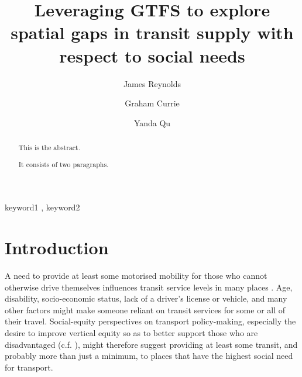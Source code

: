 \documentclass[preprint, 3p,
authoryear]{elsarticle} %
\begin{document}
\begin{frontmatter}

  \title{Leveraging GTFS to explore spatial gaps in transit supply with
respect to social needs}
    \author[Public Transport Research Group (PTRG)]{James Reynolds%
  }
    \author[Public Transport Research Group (PTRG)]{Graham Currie%
  }
    \author[Public Transport Research Group (PTRG)]{Yanda Qu%
  }
  
  \begin{abstract}
  This is the abstract.

  It consists of two paragraphs.
  \end{abstract}
    \begin{keyword}
    keyword1 \sep 
    keyword2
  \end{keyword}
  
 \end{frontmatter}

\section{Introduction}\label{introduction}

A need to provide at least some motorised mobility for those who cannot
otherwise drive themselves influences transit service levels in many
places \citep{Currie:2016aa}. Age, disability, socio-economic status,
lack of a driver's license or vehicle, and many other factors might make
someone reliant on transit services for some or all of their travel.
Social-equity perspectives on transport policy-making, especially the
desire to improve vertical equity so as to better support those who are
disadvantaged (c.f. \citet{Litman:2016aa}), might therefore suggest
providing at least some transit, and probably more than just a minimum,
to places that have the highest social need for transport.
\end{document}
